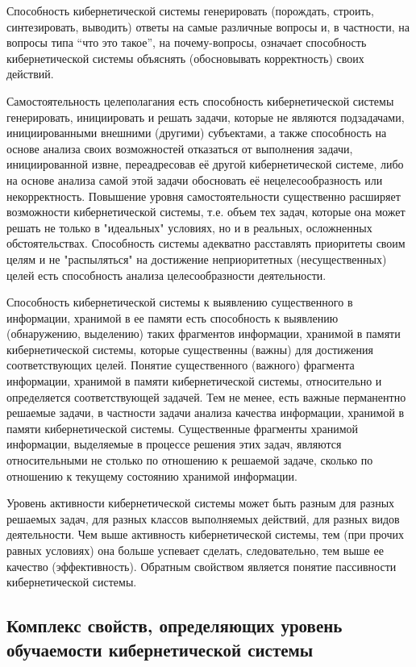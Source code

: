 Способность кибернетической системы генерировать (порождать, строить, синтезировать, выводить) ответы на самые различные вопросы и, в частности, на вопросы типа “что это такое”{}, на почему-вопросы, означает способность кибернетической системы объяснять (обосновывать корректность) своих действий.

Самостоятельность целеполагания есть способность кибернетической системы генерировать, инициировать и решать задачи, которые не являются подзадачами, инициированными внешними (другими) субъектами, а также способность на основе анализа своих возможностей отказаться от выполнения задачи, инициированной извне, переадресовав её другой кибернетической системе, либо на основе анализа самой этой задачи обосновать её нецелесообразность или некорректность. 
Повышение уровня самостоятельности существенно расширяет возможности кибернетической системы, т.е. объем тех задач, которые она может решать не только в "идеальных"{} условиях, но и в реальных, осложненных обстоятельствах.
Способность системы адекватно расставлять приоритеты своим целям и не "распыляться"{} на достижение неприоритетных (несущественных) целей есть способность анализа целесообразности деятельности.

Способность кибернетической системы к выявлению существенного в информации, хранимой в ее памяти есть способность к выявлению (обнаружению, выделению) таких фрагментов информации, хранимой в памяти кибернетической системы, которые существенны (важны) для достижения соответствующих целей.
Понятие существенного (важного) фрагмента информации, хранимой в памяти кибернетической системы, относительно и определяется соответствующей задачей.
Тем не менее, есть важные перманентно решаемые задачи, в частности задачи анализа качества информации, хранимой в памяти кибернетической системы.
Существенные фрагменты хранимой информации, выделяемые в процессе решения этих задач, являются относительными не столько по отношению к решаемой задаче, сколько по отношению к текущему состоянию хранимой информации.

Уровень активности кибернетической системы может быть разным для разных решаемых задач, для разных классов выполняемых действий, для разных видов деятельности. 
Чем выше активность кибернетической системы, тем (при прочих равных условиях) она больше успевает сделать, следовательно, тем выше ее качество (эффективность).
Обратным свойством является понятие пассивности кибернетической системы. 


\subsection{Комплекс свойств, определяющих уровень обучаемости кибернетической системы}
{\label{sec_cyb_syst_learnability_quality}} 

